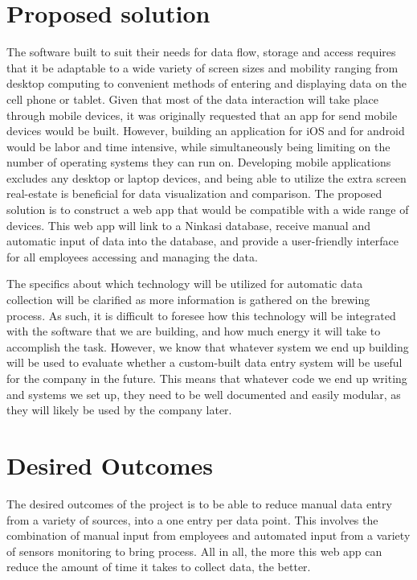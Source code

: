 \documentclass[draftclsnofoot,onecolumn,letterpaper,10pt]{IEEEtran}
\begin{document}
\section{Proposed solution}

The software built to suit their needs for data flow, storage and access requires that it be adaptable to a wide variety of screen sizes and mobility ranging from desktop computing to convenient methods of entering and displaying data on the cell phone or tablet. Given that most of the data interaction will take place through mobile devices, it was originally requested that an app for send mobile devices would be built. However, building an application for iOS and for android would be labor and time intensive, while simultaneously being limiting on the number of operating systems they can run on. Developing mobile applications excludes any desktop or laptop devices, and being able to utilize the extra screen real-estate is beneficial for data visualization and comparison. The proposed solution is to construct a web app that would be compatible with a wide range of devices. This web app will link to a Ninkasi database, receive manual and automatic input of data into the database, and provide a user-friendly interface for all employees accessing and managing the data.

The specifics about which technology will be utilized for automatic data collection will be clarified as more information is gathered on the brewing process. As such, it is difficult to foresee how this technology will be integrated with the software that we are building, and how much energy it will take to accomplish the task. However, we know that whatever system we end up building will be used to evaluate whether a custom-built data entry system will be useful for the company in the future. This means that whatever code we end up writing and systems we set up, they need to be well documented and easily modular, as they will likely be used by the company later.


\section{Desired Outcomes}

The desired outcomes of the project is to be able to reduce manual data entry from a variety of sources, into a one entry per data point. This involves the combination of manual input from employees and automated input from a variety of sensors monitoring to bring process.  All in all, the more this web app can reduce the amount of time it takes to collect data, the better.
\end{document}
